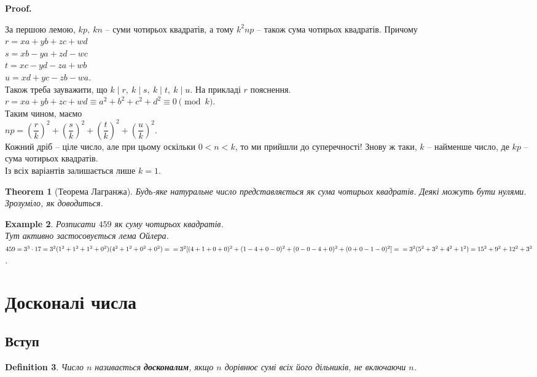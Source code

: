 \documentclass[a4paper, 10pt]{article}
\makeatletter
\theoremstyle{theoremdd}
\newtheorem{theorem}{Theorem}[subsection]
\theoremstyle{theoremdd}
\newtheorem{definition}[theorem]{Definition}
\theoremstyle{theoremdd}
\theoremstyle{theoremdd}
\newtheorem{example}[theorem]{Example}
\theoremstyle{theoremdd}
\theoremstyle{theoremdd}
\theoremstyle{theoremdd}
\theoremstyle{theoremdd}
\renewenvironment{proof}[1][Proof.\\]{\par
\pushQED{\hfill \qed}%
\normalfont \topsep6\p@\@plus6\p@\relax
\trivlist
\item\relax
{\bfseries
#1\@addpunct{.}}\hspace\labelsep\ignorespaces
}{%
\popQED\endtrivlist\@endpefalse
}
\makeatother
\begin{document}
\begin{proof}
За першою лемою, $kp,\ kn$ -- суми чотирьох квадратів, а тому $k^2np$ -- також сума чотирьох квадратів. Причому\\
$r = xa+yb+zc+wd$\\
$s = xb-ya+zd-wc$\\
$t = xc-yd-za+wb$\\
$u = xd+yc-zb-wa$.\\
Також треба зауважити, що $k \mid r,\ k \mid s,\ k \mid t,\ k \mid u$. На прикладі $r$ пояснення.\\
$r = xa+yb+zc+wd \equiv a^2+b^2+c^2+d^2 \equiv 0 \pmod k$.\\
Таким чином, маємо\\
$np = \left( \dfrac{r}{k} \right)^2 + \left( \dfrac{s}{k} \right)^2 + \left( \dfrac{t}{k} \right)^2 + \left( \dfrac{u}{k} \right)^2$.\\
Кожний дріб -- ціле число, але при цьому оскільки $0 < n < k$, то ми прийшли до суперечності! Знову ж таки, $k$ -- найменше число, де $kp$ -- сума чотирьох квадратів.\\
Із всіх варіантів залишається лише $k = 1$.
\end{proof}

\begin{theorem}[Теорема Лагранжа]
Будь-яке натуральне число представляється як сума чотирьох квадратів. Деякі можуть бути нулями.\\
\textit{Зрозуміло, як доводиться.}
\end{theorem}

\begin{example}
Розписати $459$ як суму чотирьох квадратів.\\
Тут активно застосовується лема Ойлера.\\
$459 = 3^3 \cdot 17 = 3^2 (1^2+1^2+1^2+0^2)(4^2+1^2+0^2+0^2) = \\
= 3^2[(4+1+0+0)^2+(1-4+0-0)^2+(0-0-4+0)^2+(0+0-1-0)^2] = \\ = 3^2(5^2+3^2+4^2+1^2) = 15^2 + 9^2 + 12^2 + 3^2$.\\
\end{example}
\newpage

\section{Досконалі числа}
\subsection{Вступ}
\begin{definition}
Число $n$ називається \textbf{досконалим}, якщо $n$ дорівнює сумі всіх його дільників, не включаючи $n$.
\end{definition}
\end{document}
